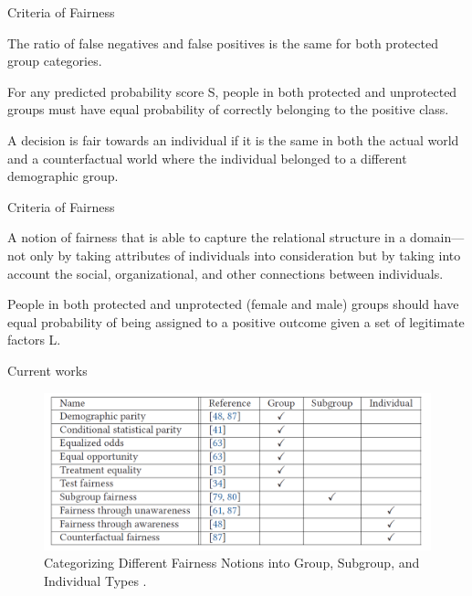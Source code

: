 \documentclass[10pt, xcolor=table,aspectratio=169]{beamer}
\begin{document}
\begin{frame}{Criteria of Fairness}
	\begin{definition}
		The ratio of false negatives and false positives is the same for both protected group categories.
	\end{definition}
	\begin{definition}
		For any predicted probability score S, people in both protected and unprotected groups must have equal probability of correctly belonging to the positive class.
	\end{definition}

	\begin{definition}
		A decision is fair towards an individual if it is the same in both the actual world and a counterfactual world where the individual belonged to a different demographic group.
	\end{definition}

\end{frame}

\begin{frame}{Criteria of Fairness}
	\begin{definition}
		A notion of fairness that is able to capture the
		relational structure in a domain—not only by taking attributes of individuals into consideration
		but by taking into account the social, organizational, and other connections between individuals.
	\end{definition}
	\begin{definition}
		People in both protected and unprotected (female and male) groups should have equal probability of being assigned to a positive outcome given a set of legitimate factors L.
	\end{definition}

\end{frame}
\begin{frame}{Current works}
	\begin{figure}[t]
		\begin{center}
			\includegraphics[width=0.8\columnwidth]{./figs/fairness_def.png}
		\end{center}
		\caption{Categorizing Different Fairness Notions into Group, Subgroup, and Individual Types \cite{mehrabi2021survey}.}
	\end{figure}
\end{frame}
\end{document}
